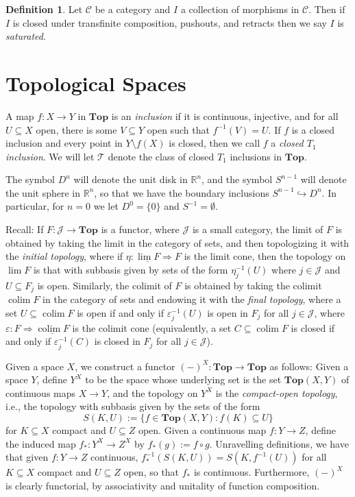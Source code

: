 \documentclass{amsart}
\theoremstyle{plain}
\theoremstyle{definition}
\newtheorem{definition}[theorem]{Definition}
\newcommand{\Top}{\mbf{Top}}
\newcommand{\sseq}{\subseteq}
\newcommand{\0}{\mathbf{0}}
\newcommand{\bR}{\mathbb{R}}
\newcommand{\cC}{\mathcal C}
\newcommand{\cJ}{\mathcal J}
\newcommand{\into}{\hookrightarrow}
\newcommand{\cT}{\mathcal T}
\newcommand{\mbf}[1]{\mathbf{#1}}
\newcommand{\vare}{\varepsilon}
\renewcommand{\(}{\left(}
\renewcommand{\)}{\right)}
\DeclareMathOperator*{\colim}{colim}
\begin{document}
\begin{definition}\label{saturated}
  Let $\cC$ be a category and $I$ a collection of morphisms in $\cC$. Then if $I$ is closed under transfinite composition, pushouts, and retracts then we say $I$ is \textit{saturated}.
\end{definition}

\section{Topological Spaces}

A map $f:X\to Y$ in $\Top$ is an \textit{inclusion} if it is continuous, injective, and for all $U\sseq X$ open, there is some $V\sseq Y$ open such that $f^{-1}(V)=U$. If $f$ is a closed inclusion and every point in $Y\setminus f(X)$ is closed, then we call $f$ a \textit{closed $T_1$ inclusion}. We will let $\cT$ denote the class of closed $T_1$ inclusions in $\Top$.

The symbol $D^n$ will denote the unit disk in $\bR^n$, and the symbol $S^{n-1}$ will denote the unit sphere in $\bR^n$, so that we have the boundary inclusions $S^{n-1}\into D^n$. In particular, for $n=0$ we let $D^0=\{0\}$ and $S^{-1}=\emptyset$.

Recall: If $F:\cJ\to\Top$ is a functor, where $\cJ$ is a small category, the limit of $F$ is obtained by taking the limit in the category of sets, and then topologizing it with the \textit{initial topology}, where if $\eta:\underline{\lim F}\Rightarrow F$ is the limit cone, then the topology on $\lim F$ is that with subbasis given by sets of the form $\eta_j^{-1}(U)$ where $j\in\cJ$ and $U\sseq F_j$ is open. Similarly, the colimit of $F$ is obtained by taking the colimit $\colim F$ in the category of sets and endowing it with the \textit{final topology}, where a set $U\sseq\colim F$ is open if and only if $\vare_j^{-1}(U)$ is open in $F_j$ for all $j\in\cJ$, where $\vare:F\Rightarrow\underline{\colim F}$ is the colimit cone (equivalently, a set $C\sseq\colim F$ is closed if and only if $\vare_j^{-1}(C)$ is closed in $F_j$ for all $j\in\cJ$).

Given a space $X$, we construct a functor $(-)^X:\Top\to\Top$ as follows: Given a space $Y$, define $Y^X$ to be the space whose underlying set is the set $\Top(X,Y)$ of continuous maps $X\to Y$, and the topology on $Y^X$ is the \textit{compact-open topology}, i.e., the topology with subbasis given by the sets of the form 
\[S(K,U):=\{f\in\Top(X,Y):f(K)\sseq U\}\]
for $K\sseq X$ compact and $U\sseq Z$ open. Given a continuous map $f:Y\to Z$, define the induced map $f_*:Y^X\to Z^X$ by $f_*(g):=f\circ g$. Unravelling definitions, we have that given $f:Y\to Z$ continuous, $f_*^{-1}(S(K,U))=S(K,f^{-1}(U))$ for all $K\sseq X$ compact and $U\sseq Z$ open, so that $f_*$ is continuous. Furthermore, $(-)^X$ is clearly functorial, by associativity and unitality of function composition.
\end{document}
